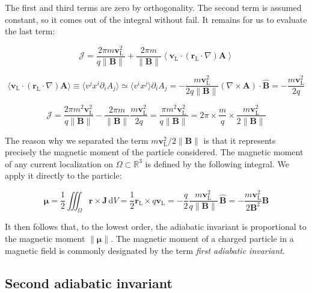 The first and third terms are zero by orthogonality. The second term is assumed constant, so it comes out of the integral without fail. It remains for us to evaluate the last term:

\begin{equation}
    \mathcal{J}=\frac{2\pi m\mathbf{v}_\text{L}^2}{q\|\mathbf{B}\|}+\frac{2\pi m}{\|\mathbf{B}\|}\left\langle\mathbf{v}_\text{L}\cdot(\mathbf{r}_\text{L}\cdot\nabla)\mathbf{A}\right\rangle
\end{equation}

\begin{equation}
    \langle\mathbf{v}_\text{L}\cdot(\mathbf{r}_\text{L}\cdot\nabla)\mathbf{A}\rangle\equiv\langle v^jx^i\partial_iA_j\rangle\simeq\langle v^ix^j\rangle\partial_iA_j=-\frac{m\mathbf{v}_\text{L}^2}{2q\|\mathbf{B}\|}\left(\nabla\times\mathbf{A}\right)\cdot\mathbf{\hat{B}}=-\frac{m\mathbf{v}_\text{L}^2}{2q}
\end{equation}

\begin{equation}
    \mathcal{J}=\frac{2\pi m^2\mathbf{v}_\text{L}^2}{q\|\mathbf{B}\|}-\frac{2\pi m}{\|\mathbf{B}\|}\frac{m\mathbf{v}_\text{L}^2}{2q}=\frac{\pi m^2\mathbf{v}_\text{L}^2}{q\|\mathbf{B}\|}=2\pi\times\frac{m}{q}\times\frac{m\mathbf{v}_\text{L}^2}{2\|\mathbf{B}\|}
\end{equation}

The reason why we separated the term $m\mathbf{v}_\text{L}^2/2\|\mathbf{B}\|$ is that it represents precisely the magnetic moment of the particle considered. The magnetic moment of any current localization on $\Omega\subset\mathbb{R}^3$ is defined by the following integral. We apply it directly to the particle:

\begin{equation}
    \boldsymbol{\mu}=\frac{1}{2}\iiint_\Omega\mathbf{r}\times\mathbf{J}\,\mathrm{d}V=\frac{1}{2}\mathbf{r}_\text{L}\times q\mathbf{v}_\text{L}=-\frac{q}{2}\frac{m\mathbf{v}_\text{L}^2}{q\|\mathbf{B}\|}\,\mathbf{\hat{B}}=-\frac{m\mathbf{v}_\text{L}^2}{2\mathbf{B}^2}\mathbf{B}
\end{equation}

It then follows that, to the lowest order, the adiabatic invariant is proportional to the magnetic moment $\|\boldsymbol{\mu}\|$. The magnetic moment of a charged particle in a magnetic field is commonly designated by the term \textit{first adiabatic invariant}.

\subsection{Second adiabatic invariant}

